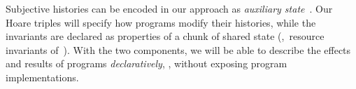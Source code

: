 Subjective histories can be encoded in our approach as \emph{auxiliary
  state}~\cite{Sergey-al:ESOP15,Owicki-Gries:CACM76}. Our Hoare
triples will specify how programs modify their histories, while the
invariants are declared as properties of a chunk of shared state
(\eg,~resource invariants of~\cite{Owicki-Gries:CACM76}). With the two
components, we will be able to describe the effects and results of
programs \emph{declaratively}, \ie, without exposing program
implementations.





